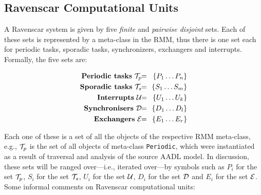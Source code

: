 %


\subsection{Ravenscar Computational Units}
A Ravenscar system is given by five \emph{finite} and \emph{pairwise
  disjoint} sets. Each of these sets is represented by a meta-class in
the RMM, thus there is one set each for periodic tasks, sporadic
tasks, synchronizers, exchangers and interrupts. Formally, the five
sets are:

\begin{eqnarray}
  \nonumber
  \text{\textbf{Periodic tasks}} \ {\cal T}_p \!& \!= \!&\! \{P_1 \ldots P_n\}\\
  \nonumber
  \text{\textbf{Sporadic tasks}} \  {\cal T}_s  \! & \!= \! & \!  \{S_1  \ldots S_m\} \\
  \nonumber
  \text{\textbf{Interrupts}} \   {\cal U} \! & \!= \! & \! \{U_1  \ldots U_k\}  \\ 
  \nonumber
  \text{\textbf{Synchronisers}} \    {\cal D} \! & \!= \! & \! \{D_1 \ldots D_l\} \\  
  \nonumber
  \text{\textbf{Exchangers}} \  {\cal E} \! & \!= \! & \! \{E_1  \ldots E_r\} 
\end{eqnarray}

Each one of these is a set of all the objects of the respective RMM
meta-class, e.g., ${\cal T}_p$ is the set of all objects of meta-class
\texttt{Periodic}, which were instantiated as a result of traversal
and analysis of the source AADL model. In discussion, these sets will
be ranged over---i.e., iterated over---by symbols such as $P_i$ for
the set ${\cal T}_p$, $S_i$ for the set ${\cal T}_s$, $U_i$ for the
set ${\cal U}$, $D_i$ for the set ${\cal D}$ and $E_i$ for the set
${\cal E}$. Some informal comments on Ravenscar computational units:

